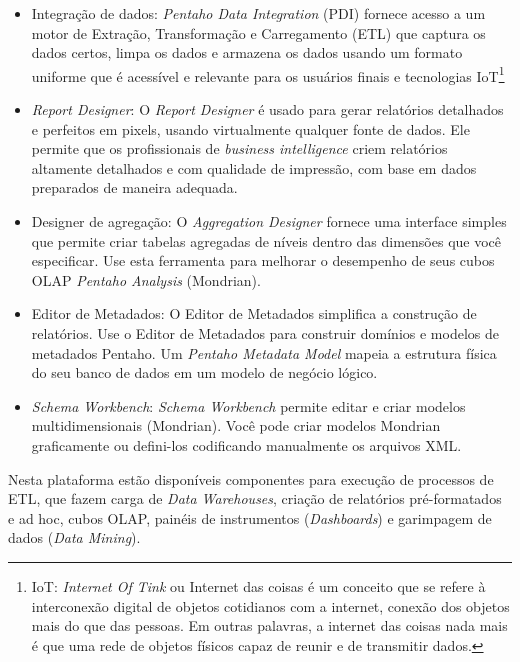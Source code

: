 \begin{itemize}
   \item Integra\c{c}\~{a}o de dados: \textit{Pentaho Data Integration} (PDI) fornece acesso a um motor de Extra\c{c}\~{a}o, Transforma\c{c}\~{a}o e Carregamento (ETL) que captura os dados certos, limpa os dados e armazena os dados usando um formato uniforme que \'{e} acess\'{i}vel e relevante para os usu\'{a}rios finais e tecnologias IoT\footnote{IoT: \textit{Internet Of Tink} ou Internet das coisas \'{e} um conceito que se refere \`{a} interconex\~{a}o digital de objetos cotidianos com a internet, conex\~{a}o dos objetos mais do que das pessoas. Em outras palavras, a internet das coisas nada mais \'{e} que uma rede de objetos f\'{i}sicos capaz de reunir e de transmitir dados.}
   
   \item \textit{Report Designer}: O \textit{Report Designer} \'{e} usado para gerar relat\'orios detalhados e perfeitos em pixels, usando virtualmente qualquer fonte de dados. Ele permite que os profissionais de \textit{business intelligence} criem relat\'orios altamente detalhados e com qualidade de impress\~{a}o, com base em dados preparados de maneira adequada.

   \item Designer de agrega\c{c}\~{a}o: O \textit{Aggregation Designer} fornece uma interface simples que permite criar tabelas agregadas de n\'{i}veis dentro das dimens\~{o}es que você especificar. Use esta ferramenta para melhorar o desempenho de seus cubos OLAP \textit{Pentaho Analysis} (Mondrian).

   \item Editor de Metadados: O Editor de Metadados simplifica a constru\c{c}\~{a}o de relat\'orios. Use o Editor de Metadados para construir dom\'{i}nios e modelos de metadados Pentaho. Um \textit{Pentaho Metadata Model} mapeia a estrutura f\'{i}sica do seu banco de dados em um modelo de neg\'ocio l\'ogico.

    \item \textit{Schema Workbench}: \textit{Schema Workbench} permite editar e criar modelos multidimensionais (Mondrian). Você pode criar modelos Mondrian graficamente ou defini-los codificando manualmente os arquivos XML.
\end{itemize}

Nesta plataforma est\~{a}o dispon\'{i}veis componentes para execu\c{c}\~{a}o de processos de ETL, que fazem carga de \textit{Data Warehouses}, cria\c{c}\~{a}o de relat\'orios pr\'{e}-formatados e ad hoc, cubos OLAP, pain\'{e}is de instrumentos (\textit{Dashboards}) e garimpagem de dados (\textit{Data Mining}). 

